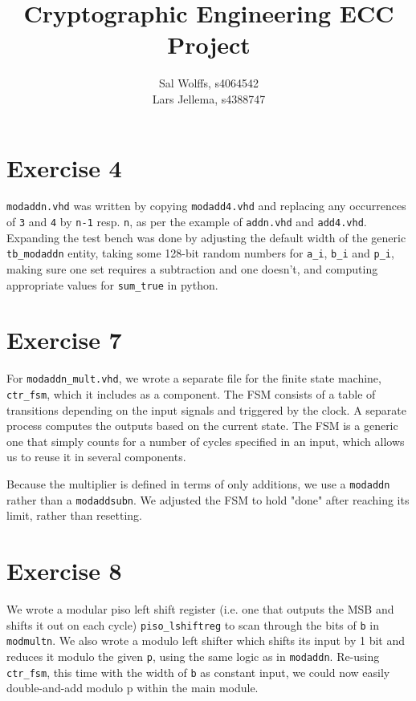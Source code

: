 \documentclass[a4paper,twoside]{article}
\title{Cryptographic Engineering ECC Project}
\author{Sal Wolffs, s4064542
\\ Lars Jellema, s4388747}
\newcommand{\atom}[1]{\mbox{\texttt{#1}}}
\begin{document}
\maketitle

\section*{Exercise 4}
\atom{modaddn.vhd} was written by copying \atom{modadd4.vhd} and replacing any
occurrences of \atom{3} and \atom{4} by \atom{n-1} resp. \atom{n}, as per the
example of \atom{addn.vhd} and \atom{add4.vhd}. Expanding the test bench was
done by adjusting the default width of the generic \atom{tb\_modaddn} entity,
taking some 128-bit random numbers for \atom{a\_i}, \atom{b\_i} and \atom{p\_i},
making sure one set requires a subtraction and one doesn't, and computing
appropriate values for \atom{sum\_true} in python.

\section*{Exercise 7}
For \atom{modaddn\_mult.vhd}, we wrote a separate file for the finite state
machine, \atom{ctr\_fsm}, which it includes as a component. The FSM consists of
a table of transitions depending on the input signals and triggered by the
clock. A separate process computes the outputs based on the current state. The
FSM is a generic one that simply counts for a number of cycles specified in an
input, which allows us to reuse it in several components.

Because the multiplier is defined in terms of only additions, we use a
\atom{modaddn} rather than a \atom{modaddsubn}. We adjusted the FSM to hold
"done" after reaching its limit, rather than resetting.

\section*{Exercise 8}
We wrote a modular piso left shift register (i.e. one that outputs the MSB and
shifts it out on each cycle) \atom{piso\_lshiftreg} to scan through the bits of
\atom{b} in \atom{modmultn}. We also wrote a modulo left shifter which shifts
its input by 1 bit and reduces it modulo the given \atom{p}, using the same
logic as in \atom{modaddn}. Re-using \atom{ctr\_fsm}, this time with the width
of \atom{b} as constant input, we could now easily double-and-add modulo p
within the main module.
\end{document}
